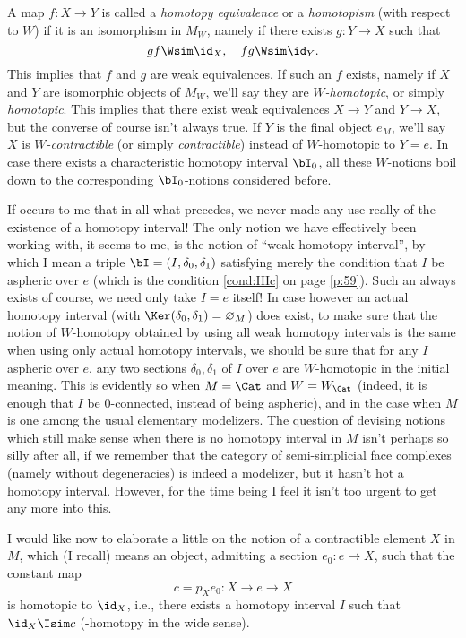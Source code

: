 A map $f:X\to Y$ is called a \emph{homotopy equivalence} or a
\emph{homotopism} (with respect to $W$) if it is an isomorphism in
$M_W$, namely if there exists $g:Y\to X$ such that
\[gf\Wsim\id_X, \quad fg\Wsim\id_Y.\]
This implies that $f$ and $g$ are weak equivalences. If such an $f$
exists, namely if $X$ and $Y$ are isomorphic objects of $M_W$, we'll
say they are \emph{$W$-homotopic}, or simply \emph{homotopic}. This
implies that there exist weak equivalences $X\to Y$ and $Y\to X$, but
the converse of course isn't always true. If $Y$ is the final object
$e_M$, we'll say $X$ is \emph{$W$-contractible} (or simply
\emph{contractible}) instead of $W$-homotopic to $Y=e$. In case there
exists a characteristic homotopy interval $\bI_0$, all these
$W$-notions boil down to the corresponding $\bI_0$-notions considered
before.
\begin{remark}
  If occurs to me that in all what precedes, we never made any use
  really of the existence of a homotopy interval! The only notion we
  have effectively been working with, it seems to me, is the notion of
  ``weak homotopy interval'', by which I mean a triple
  $\bI=(I,\delta_0,\delta_1)$ satisfying merely the condition that $I$
  be aspheric over $e$ (which is the condition \ref{cond:HIc} on page
  \ref{p:59}). Such an \bI{} always exists of course, we need only
  take $I=e$ itself! In case however an actual homotopy interval (with
  $\Ker(\delta_0,\delta_1)=\varnothing_M$) does exist, to make sure that
  the notion of $W$-homotopy obtained by using all weak homotopy
  intervals is the same when using only actual homotopy intervals, we
  should be sure that for any $I$ aspheric over $e$, any two sections
  $\delta_0,\delta_1$ of $I$ over $e$ are $W$-homotopic in the initial
  meaning. This is evidently so when $M=\Cat$ and $W=W_\Cat$ (indeed,
  it is enough that $I$ be $0$-connected, instead of being
  aspheric), and in the case when $M$ is one among the usual
  elementary modelizers. The question of devising notions which still
  make sense when there is no homotopy interval in $M$ isn't perhaps
  so silly after all, if we remember that the category of
  semi-simplicial face complexes (namely without degeneracies) is
  indeed a modelizer, but it hasn't hot a homotopy interval. However,
  for the time being I feel it isn't too urgent to get any more into this.
\end{remark}

\label{sec:49}%
I would like now to elaborate a little on the notion of a contractible
element $X$ in $M$, which (I recall) means an object, admitting a
section $e_0:e\to X$, such that the constant map
\[c = p_Xe_0 : X\to e\to X\]
is homotopic to $\id_X$, i.e., there exists a homotopy interval $I$
such that $\id_X\Isim c$ (\bI-homotopy in the wide sense).

